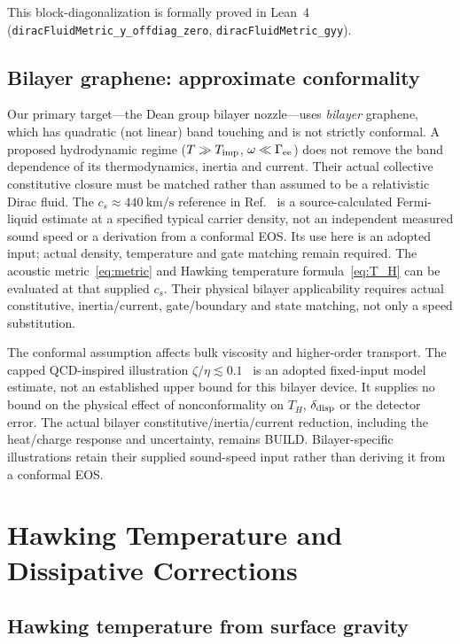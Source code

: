 \documentclass[aps,prd,twocolumn,showpacs,superscriptaddress,nofootinbib]{revtex4-2}
\begin{document}
This block-diagonalization is formally proved in Lean~4
(\texttt{diracFluidMetric\_y\_offdiag\_zero},
\texttt{diracFluidMetric\_gyy}).

\subsection{Bilayer graphene: approximate conformality}
\label{sec:bilayer}

Our primary target---the Dean group bilayer nozzle---uses \emph{bilayer}
graphene, which has quadratic (not linear) band touching and is not
strictly conformal. A proposed hydrodynamic regime ($T\gg T_{\rm imp}$,
$\omega\ll\Gamma_{\rm ee}$) does not remove the band dependence of
its thermodynamics, inertia and current. Their actual collective
constitutive closure must be matched rather than assumed to be a
relativistic Dirac fluid. The
$c_s\approx\SI{440}{\kilo\meter/\second}$ reference in
Ref.~\cite{Geurs2025} is a source-calculated Fermi-liquid estimate
at a specified typical carrier density, not an independent measured
sound speed or a derivation from a conformal EOS. Its use here is
an adopted input; actual density, temperature and gate matching remain
required. The acoustic metric~\eqref{eq:metric} and Hawking temperature
formula~\eqref{eq:T_H} can be evaluated at that supplied $c_s$.
Their physical bilayer applicability requires actual constitutive,
inertia/current, gate/boundary and state matching, not only a speed
substitution.

The conformal assumption affects bulk viscosity and higher-order
transport. The capped QCD-inspired illustration
$\zeta/\eta\lesssim0.1$~\cite{Romatschke2010} is an adopted
fixed-input model estimate, not an established upper bound for
this bilayer device. It supplies no bound on the physical effect
of nonconformality on $T_H$, $\delta_{\rm disp}$ or the detector
error. The actual bilayer constitutive/inertia/current reduction,
including the heat/charge response and uncertainty, remains BUILD.
Bilayer-specific illustrations retain their supplied sound-speed
input rather than deriving it from a conformal EOS.

\section{Hawking Temperature and Dissipative Corrections}
\label{sec:hawking}

\subsection{Hawking temperature from surface gravity}
\end{document}
